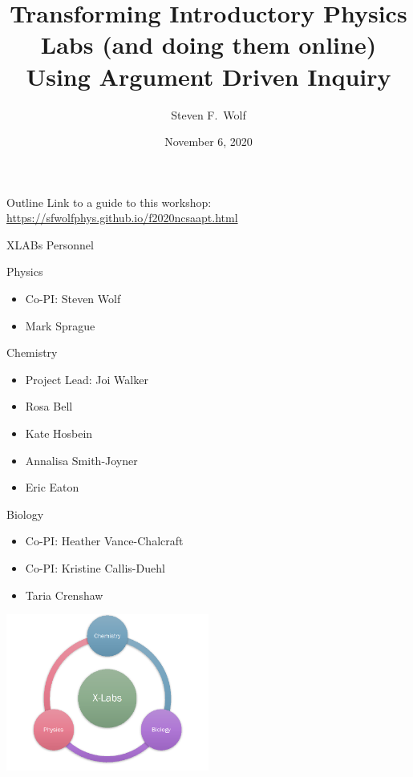 \documentclass[xcolor=dvipsnames,table]{beamer}
\title[ADI Physics Labs]{Transforming Introductory Physics Labs (and doing them online) Using
  Argument Driven Inquiry}
\author[Steven F.\ Wolf]{Steven F.~Wolf}
\institute[\url{wolfs15@ecu.edu}]{East Carolina University Department of Physics}
\date{November 6, 2020}
\begin{document}
\begin{frame}
  \titlepage 
\end{frame}

\begin{frame}{Outline}
  Link to a guide to this workshop: \url{https://sfwolfphys.github.io/f2020ncsaapt.html}
  \tableofcontents
\end{frame}

\begin{frame}{XLABs Personnel}
  \noindent
  \begin{minipage}{0.48\textwidth}\scriptsize
    \begin{block}{Physics}
      \begin{itemize}
        \item Co-PI: Steven Wolf
        \item Mark Sprague
      \end{itemize}
    \end{block}
    \begin{block}{Chemistry}
      \begin{itemize}
        \item Project Lead: Joi Walker
        \item Rosa Bell
        \item Kate Hosbein
        \item Annalisa Smith-Joyner
        \item Eric Eaton
      \end{itemize}
    \end{block}
  \end{minipage}\hfill%
  \begin{minipage}{0.48\textwidth}\scriptsize
    \begin{block}{Biology}
      \begin{itemize}
        \item Co-PI: Heather Vance-Chalcraft
        \item Co-PI: Kristine Callis-Duehl
        \item Taria Crenshaw
      \end{itemize}
    \end{block}
    \begin{center}
      \includegraphics[width=0.5\textwidth,trim = 60 0 70 0, clip]{./logos/xlabsLogo.png}%

\end{center}
\end{minipage}
\end{frame}
\end{document}
